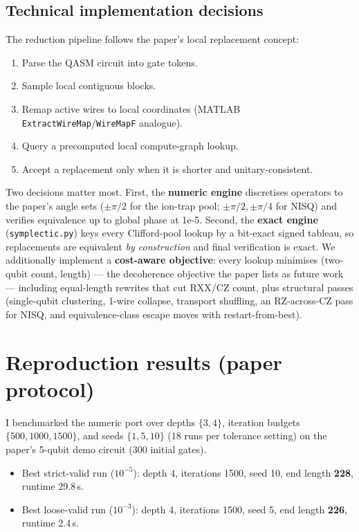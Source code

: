 \documentclass[11pt,a4paper]{article}
\begin{document}
\subsection{Technical implementation decisions}
The reduction pipeline follows the paper's local replacement concept:
\begin{enumerate}
    \item Parse the QASM circuit into gate tokens.
    \item Sample local contiguous blocks.
    \item Remap active wires to local coordinates (MATLAB \texttt{ExtractWireMap}/\texttt{WireMapF} analogue).
    \item Query a precomputed local compute-graph lookup.
    \item Accept a replacement only when it is shorter and unitary-consistent.
\end{enumerate}
Two decisions matter most. First, the \textbf{numeric engine} discretises
operators to the paper's angle sets ($\pm\pi/2$ for the ion-trap pool;
$\pm\pi/2, \pm\pi/4$ for NISQ) and verifies equivalence up to global phase at
1e-5. Second, the \textbf{exact engine} (\texttt{symplectic.py}) keys every
Clifford-pool lookup by a bit-exact signed tableau, so replacements are
equivalent \emph{by construction} and final verification is exact. We
additionally implement a \textbf{cost-aware objective}: every lookup minimises
(two-qubit count, length) --- the decoherence objective the paper lists as
future work --- including equal-length rewrites that cut RXX/CZ count, plus
structural passes (single-qubit clustering, 1-wire collapse, transport
shuffling, an RZ-across-CZ pass for NISQ, and equivalence-class escape moves
with restart-from-best).

\section{Reproduction results (paper protocol)}
\label{sec:protocol}
I benchmarked the numeric port over depths $\{3,4\}$, iteration budgets
$\{500,1000,1500\}$, and seeds $\{1,5,10\}$ (18 runs per tolerance setting) on
the paper's 5-qubit demo circuit (300 initial gates).
\begin{itemize}
    \item Best strict-valid run ($10^{-5}$): depth 4, iterations 1500, seed 10, end length \textbf{228}, runtime 29.8\,s.
    \item Best loose-valid run ($10^{-3}$): depth 4, iterations 1500, seed 5, end length \textbf{226}, runtime 2.4\,s.
\end{itemize}
\end{document}
